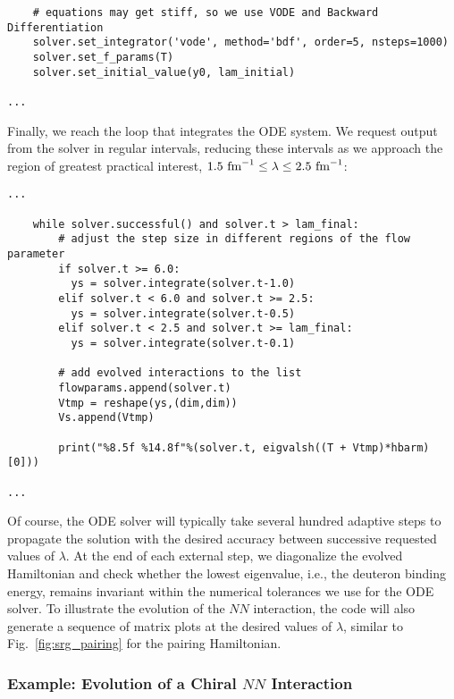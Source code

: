 {\begin{lstlisting}
    # equations may get stiff, so we use VODE and Backward Differentiation
    solver.set_integrator('vode', method='bdf', order=5, nsteps=1000)
    solver.set_f_params(T)
    solver.set_initial_value(y0, lam_initial)

...
\end{lstlisting}

Finally, we reach the loop that integrates the ODE system. We request
output from the solver in regular intervals, reducing these intervals
as we approach the region of greatest practical interest, 
$1.5\,\,\text{fm}^{-1}\leq \lambda \leq 2.5\,\,\text{fm}^{-1}$: 

\begin{lstlisting}
...

    while solver.successful() and solver.t > lam_final:
        # adjust the step size in different regions of the flow parameter
        if solver.t >= 6.0:
          ys = solver.integrate(solver.t-1.0)
        elif solver.t < 6.0 and solver.t >= 2.5:
          ys = solver.integrate(solver.t-0.5)
        elif solver.t < 2.5 and solver.t >= lam_final:
          ys = solver.integrate(solver.t-0.1)

        # add evolved interactions to the list
        flowparams.append(solver.t)
        Vtmp = reshape(ys,(dim,dim))
        Vs.append(Vtmp)

        print("%8.5f %14.8f"%(solver.t, eigvalsh((T + Vtmp)*hbarm)[0]))

...
\end{lstlisting}

Of course, the ODE solver will typically take several hundred adaptive 
steps to propagate the solution with the desired accuracy between successive 
requested values of $\lambda$. At the end of each external 
step, we diagonalize the evolved Hamiltonian
and check whether the lowest eigenvalue, i.e., the deuteron binding
energy, remains invariant within the numerical tolerances we use for
the ODE solver. To illustrate the evolution of the $NN$ interaction, 
the code will also generate a sequence of matrix plots at the
desired values of $\lambda$, similar to Fig.~\ref{fig:srg_pairing}
for the pairing Hamiltonian.

%
%
\subsubsection{\label{sec:srg_n3lo}Example: Evolution of a Chiral $NN$ Interaction}


}
